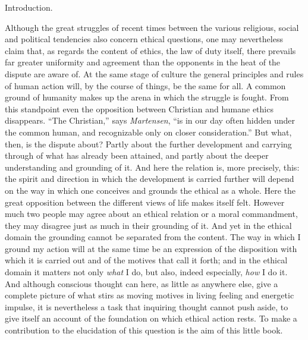 \documentclass[12pt,a4paper,openany]{book}
\newcommand{\opage}[1]{\marginnote{\footnotesize\textit{[#1]}}}
\newcommand{\chap}[1]{\clearpage\addcontentsline{toc}{chapter}{#1}\vspace*{2em}\begin{center}{\large #1}\end{center}\medskip}
\begin{document}
\chap{Introduction.}
\opage{1}Although the great struggles of recent times between the various
religious, social and political tendencies also concern ethical questions,
one may nevertheless claim that, as regards the content of ethics, the law
of duty itself, there prevails far greater uniformity and agreement than
the opponents in the heat of the dispute are aware of. At the same stage of
culture the general principles and rules of human action will, by the
course of things, be the same for all. A common ground of humanity makes up
the arena in which the struggle is fought. From this standpoint even the
opposition between Christian and humane ethics disappears. ``The
Christian,'' says \emph{Martensen}, ``is in our day often hidden under the
common human, and recognizable only on closer consideration.'' But what,
then, is the dispute about? Partly about the further development and
carrying through of what has already been attained, and partly about the
deeper understanding and grounding of it. And here the relation is, more
precisely, this: the spirit and direction in which the development is
carried further will depend on the way in which one conceives and grounds
the ethical as a whole. Here the great opposition between the different
views of life makes itself felt.
\opage{2}However much two people may agree about an ethical relation or a
moral commandment, they may disagree just as much in their grounding of it.
And yet in the ethical domain the grounding cannot be separated from the
content. The way in which I ground my action will at the same time be an
expression of the disposition with which it is carried out and of the
motives that call it forth; and in the ethical domain it matters not only
\emph{what} I do, but also, indeed especially, \emph{how} I do it. And
although conscious thought can here, as little as anywhere else, give a
complete picture of what stirs as moving motives in living feeling and
energetic impulse, it is nevertheless a task that inquiring thought cannot
push aside, to give itself an account of the foundation on which ethical
action rests. To make a contribution to the elucidation of this question is
the aim of this little book.
\end{document}
